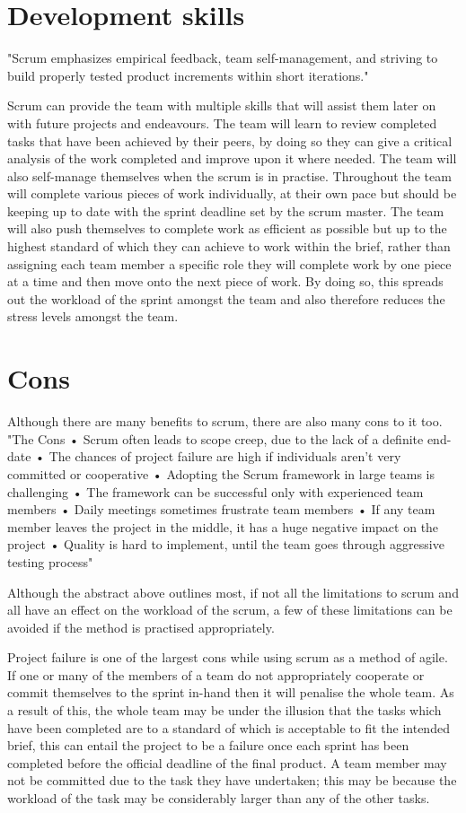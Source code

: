 \documentclass{scrartcl}
\begin{document}
\section{Development skills}
"Scrum emphasizes empirical feedback, team self-management, and striving to build properly tested product increments within short iterations." \cite{agile methodology rss}

Scrum can provide the team with multiple skills that will assist them later on with future projects and endeavours. The team will learn to review completed tasks that have been achieved by their peers, by doing so they can give a critical analysis of the work completed and improve upon it where needed. The team will also self-manage themselves when the scrum is in practise. Throughout the team will complete various pieces of work individually, at their own pace but should be keeping up to date with the sprint deadline set by the scrum master. The team will also push themselves to complete work as efficient as possible but up to the highest standard of which they can achieve to work within the brief, rather than assigning each team member a specific role they will complete work by one piece at a time and then move onto the next piece of work. By doing so, this spreads out the workload of the sprint amongst the team and also therefore reduces the stress levels amongst the team.

\section{Cons}
Although there are many benefits to scrum, there are also many cons to it too. 
"The Cons
•	Scrum often leads to scope creep, due to the lack of a definite end-date
•	The chances of project failure are high if individuals aren't very committed or cooperative
•	Adopting the Scrum framework in large teams is challenging
•	The framework can be successful only with experienced team members
•	Daily meetings sometimes frustrate team members
•	If any team member leaves the project in the middle, it has a huge negative impact on the project
•	Quality is hard to implement, until the team goes through aggressive testing process" \cite{2017}

Although the abstract above outlines most, if not all the limitations to scrum and all have an effect on the workload of the scrum, a few of these limitations can be avoided if the method is practised appropriately.

Project failure is one of the largest cons while using scrum as a method of agile. If one or many of the members of a team do not appropriately cooperate or commit themselves to the sprint in-hand then it will penalise the whole team. As a result of this, the whole team may be under the illusion that the tasks which have been completed are to a standard of which is acceptable to fit the intended brief, this can entail the project to be a failure once each sprint has been completed before the official deadline of the final product. A team member may not be committed due to the task they have undertaken; this may be because the workload of the task may be considerably larger than any of the other tasks.
 
\end{document}
